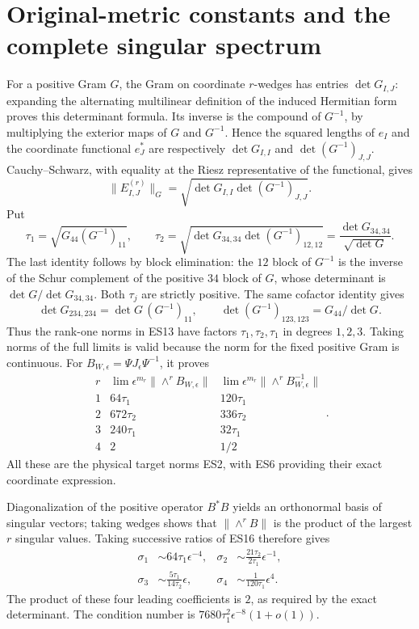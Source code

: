 \documentclass[11pt]{article}
\begin{document}
\section{Original-metric constants and the complete singular spectrum}
For a positive Gram $G$, the Gram on coordinate $r$-wedges has
entries $\det G_{I,J}$: expanding the alternating multilinear
definition of the induced Hermitian form proves this determinant
formula. Its inverse is the compound of $G^{-1}$, by multiplying
the exterior maps of $G$ and $G^{-1}$. Hence the squared lengths of
$e_I$ and the coordinate functional $e_J^*$ are respectively
$\det G_{I,I}$ and $\det(G^{-1})_{J,J}$. Cauchy--Schwarz, with
equality at the Riesz representative of the functional, gives
\[
 \|E_{I,J}^{(r)}\|_G
 =\sqrt{\det G_{I,I}\det(G^{-1})_{J,J}}.
 \tag{ES14}
\]
Put
\[
 \tau_1=\sqrt{G_{44}(G^{-1})_{11}},\qquad
 \tau_2=\sqrt{\det G_{34,34}\det(G^{-1})_{12,12}}
       =\frac{\det G_{34,34}}{\sqrt{\det G}}.
 \tag{ES15}
\]
The last identity follows by block elimination: the $12$ block
of $G^{-1}$ is the inverse of the Schur complement of the positive
$34$ block of $G$, whose determinant is $\det G/\det G_{34,34}$.
Both $\tau_j$ are strictly positive. The same cofactor identity
gives
\[
 \det G_{234,234}=\det G\,(G^{-1})_{11},\qquad
 \det(G^{-1})_{123,123}=G_{44}/\det G.
\]
Thus the rank-one norms in ES13 have factors $\tau_1,\tau_2,
\tau_1$ in degrees $1,2,3$. Taking norms of the full limits is
valid because the norm for the fixed positive Gram is continuous.
For $B_{W,\epsilon}=\Psi J_\epsilon\Psi^{-1}$, it proves
\[
\begin{array}{c|c|c}
 r&\lim\epsilon^{m_r}\|\wedge^r B_{W,\epsilon}\|&
 \lim\epsilon^{m_r}\|\wedge^r B_{W,\epsilon}^{-1}\|\\\hline
 1&64\tau_1&120\tau_1\\
 2&672\tau_2&336\tau_2\\
 3&240\tau_1&32\tau_1\\
 4&2&1/2
\end{array}.
\tag{ES16}
\]
All these are the physical target norms ES2, with ES6 providing
their exact coordinate expression.

Diagonalization of the positive operator $B^*B$ yields an
orthonormal basis of singular vectors; taking wedges shows that
$\|\wedge^rB\|$ is the product of the largest $r$ singular
values. Taking successive ratios of ES16 therefore gives
\[
\begin{aligned}
 \sigma_1&\sim64\tau_1\epsilon^{-4},&
 \sigma_2&\sim\frac{21\tau_2}{2\tau_1}\epsilon^{-1},\\
 \sigma_3&\sim\frac{5\tau_1}{14\tau_2}\epsilon,&
 \sigma_4&\sim\frac{1}{120\tau_1}\epsilon^4.
\end{aligned}\tag{ES17}
\]
The product of these four leading coefficients is $2$, as required
by the exact determinant. The condition number is
$7680\tau_1^2\epsilon^{-8}(1+o(1))$.
\end{document}
